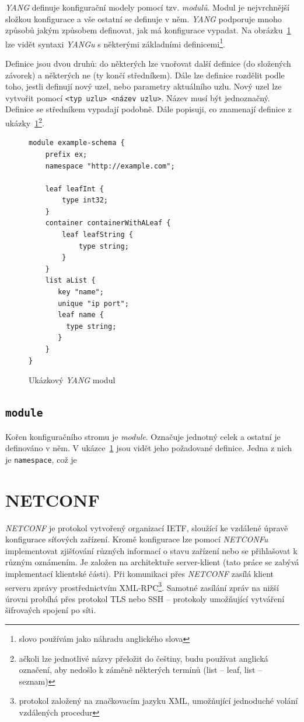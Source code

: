 \documentclass[thesis=B,czech,hidelinks]{FITthesis}[2019/03/06]
\begin{document}
\textit{YANG} definuje konfigurační modely pomocí tzv. \textit{modulů}. Modul je nejvrchnější složkou konfigurace a vše ostatní se definuje v něm. \textit{YANG} podporuje mnoho způsobů jakým způsobem definovat, jak má konfigurace vypadat. Na obrázku~\ref{yang_ukazka} lze vidět syntaxi \textit{YANGu} s některými základními definicemi\footnote{slovo  používám jako náhradu anglického slova }.

Definice jsou dvou druhů: do některých lze vnořovat další definice (do složených závorek) a některých ne (ty končí středníkem). Dále lze definice rozdělit podle toho, jestli definují nový uzel, nebo parametry aktuálního uzlu. Nový uzel lze vytvořit pomocí \texttt{<typ~uzlu>~<název~uzlu>}. Název musí být jednoznačný. Definice se středníkem vypadají podobně. Dále popisuji, co znamenají definice z ukázky~\ref{yang_ukazka}\footnote{ačkoli lze jednotlivé názvy přeložit do češtiny, budu používat anglická označení, aby nedošlo k záměně některých termínů (list -- leaf, list -- seznam)}.

\begin{figure}
\begin{verbatim}
module example-schema {
    prefix ex;
    namespace "http://example.com";

    leaf leafInt {
        type int32;
    }
    container containerWithALeaf {
        leaf leafString {
            type string;
        }
    }
    list aList {
       key "name";
       unique "ip port";
       leaf name {
         type string;
       }
    }
}
\end{verbatim}
\caption{Ukázkový \textit{YANG} modul}\label{yang_ukazka}
\end{figure}
\subsection{\texttt{module}}
Kořen konfiguračního stromu je \textit{module}. Označuje jednotný celek a ostatní je definováno v něm. V ukázce~\ref{yang_ukazka} jsou vidět jeho požadované definice. Jedna z nich je \texttt{namespace}, což je 


\section{NETCONF}
\textit{NETCONF} je protokol vytvořený organizací IETF, sloužící ke vzdálené úpravě konfigurace síťových zařízení. Kromě konfigurace lze pomocí \textit{NETCONFu} implementovat zjišťování různých informací o stavu zařízení nebo se přihlašovat k různým oznámením. Je založen na architektuře server-klient (tato práce se zabývá implementací klientské části). Při komunikaci přes \textit{NETCONF} zasílá klient serveru zprávy prostřednictvím XML-RPC\footnote{protokol založený na značkovacím jazyku XML, umožňující jednoduché volání vzdálených procedur}. Samotné zasílání zpráv na nižší úrovni probíhá přes protokol TLS nebo SSH -- protokoly umožňující vytváření šifrovaých spojení po síti.
\end{document}

